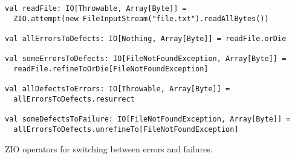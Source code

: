 \begin{algorithm}

\begin{verbatim}
val readFile: IO[Throwable, Array[Byte]] =
  ZIO.attempt(new FileInputStream("file.txt").readAllBytes())

val allErrorsToDefects: IO[Nothing, Array[Byte]] = readFile.orDie

val someErrorsToDefects: IO[FileNotFoundException, Array[Byte]] =
  readFile.refineToOrDie[FileNotFoundException]

val allDefectsToErrors: IO[Throwable, Array[Byte]] =
  allErrorsToDefects.resurrect

val someDefectsToFailure: IO[FileNotFoundException, Array[Byte]] =
  allErrorsToDefects.unrefineTo[FileNotFoundException]
\end{verbatim}

\caption{ZIO operators for switching between errors and failures. \label{zio:defect-handling}}
\end{algorithm}